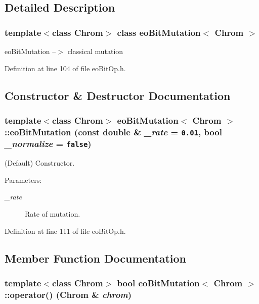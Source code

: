 \subsection{Detailed Description}
\subsubsection*{template$<$class Chrom$>$ class eo\-Bit\-Mutation$<$ Chrom $>$}

eo\-Bit\-Mutation --$>$ classical mutation 



Definition at line 104 of file eo\-Bit\-Op.h.

\subsection{Constructor \& Destructor Documentation}
\subsubsection{\setlength{\rightskip}{0pt plus 5cm}template$<$class Chrom$>$ {\bf eo\-Bit\-Mutation}$<$ Chrom $>$::{\bf eo\-Bit\-Mutation} (const double \& {\em \_\-rate} = {\tt 0.01}, bool {\em \_\-normalize} = {\tt false})\hspace{0.3cm}{\tt  [inline]}}\label{classeo_bit_mutation_a0}


(Default) Constructor. 

\begin{Desc}
\item[Parameters:]
\begin{description}
\item[{\em \_\-rate}]Rate of mutation. \end{description}
\end{Desc}


Definition at line 111 of file eo\-Bit\-Op.h.

\subsection{Member Function Documentation}
\subsubsection{\setlength{\rightskip}{0pt plus 5cm}template$<$class Chrom$>$ bool {\bf eo\-Bit\-Mutation}$<$ Chrom $>$::operator() (Chrom \& {\em chrom})\hspace{0.3cm}{\tt  [inline, virtual]}}\label{classeo_bit_mutation_a2}



